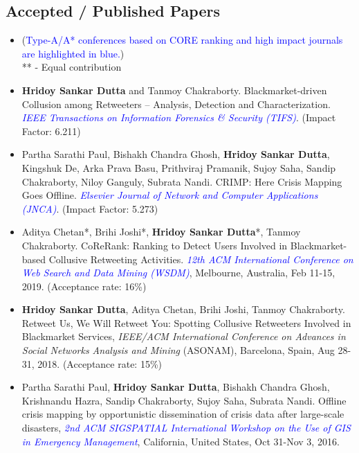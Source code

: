 \documentclass[margin, centered]{res}
\begin{document}
\begin{resume}
\section{Accepted / Published Papers}
\begin{itemize}[leftmargin=*]
\item[] (\textcolor{blue}{Type-A/A* conferences based on CORE ranking and high impact journals are highlighted in blue.}) \\ ** - Equal contribution

\item \textbf{Hridoy Sankar Dutta} and Tanmoy Chakraborty. Blackmarket-driven Collusion among Retweeters – Analysis, Detection and Characterization. \textit{\textcolor{blue}{IEEE Transactions on Information Forensics \& Security (TIFS)}}. (Impact Factor: 6.211)

\item Partha Sarathi Paul, Bishakh Chandra Ghosh, \textbf{Hridoy Sankar Dutta}, Kingshuk De, Arka Prava Basu, Prithviraj Pramanik, Sujoy Saha, Sandip Chakraborty, Niloy Ganguly, Subrata Nandi. CRIMP: Here Crisis Mapping Goes Offline. \textit{\textcolor{blue}{Elsevier Journal of Network and Computer Applications (JNCA)}}. (Impact Factor: 5.273)

\item  Aditya Chetan*, Brihi Joshi*, \textbf{Hridoy Sankar Dutta}*, Tanmoy Chakraborty. CoReRank: Ranking to Detect Users Involved in Blackmarket-based Collusive Retweeting Activities. \textit{\textcolor{blue}{12th ACM International Conference on Web Search and Data Mining (WSDM)}}, Melbourne, Australia, Feb 11-15, 2019. (Acceptance rate: 16\%)


\item \textbf{Hridoy Sankar Dutta}, Aditya Chetan, Brihi Joshi, Tanmoy Chakraborty. Retweet Us, We Will Retweet You: Spotting Collusive Retweeters Involved in Blackmarket Services, \textit{IEEE/ACM International Conference on Advances in Social Networks Analysis and Mining} (ASONAM), Barcelona, Spain, Aug 28-31, 2018. (Acceptance rate: 15\%)

\item Partha Sarathi Paul, \textbf{Hridoy Sankar Dutta}, Bishakh Chandra Ghosh, Krishnandu Hazra, Sandip Chakraborty, Sujoy Saha, Subrata Nandi. Offline crisis mapping by opportunistic dissemination of crisis data after large-scale disasters, \textit{\textcolor{blue}{2nd ACM SIGSPATIAL International Workshop on the Use of GIS in Emergency Management}}, California, United States, Oct 31-Nov 3, 2016.


\end{itemize}
\end{resume}
\end{document}
